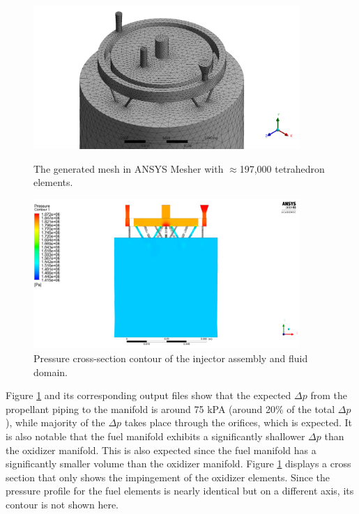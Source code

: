 \documentclass[9pt]{article} %
\numberwithin{equation}{section} %
\begin{document}
\begin{figure}
    \centering
    \begin{minipage}{0.49\textwidth}
        \centering
        \includegraphics[scale=0.5, width=0.9\textwidth]{sim_files/mesh_ss.png} %
        \caption{The generated mesh in ANSYS Mesher with $\approx$197,000 tetrahedron elements.}
        \label{fig:mesh}
    \end{minipage}\hfill
    \begin{minipage}{0.49\textwidth}
        \centering
        \includegraphics[scale=0.5, width=0.9\textwidth]{sim_files/pres_xsect1.png} %
        \caption{Pressure cross-section contour of the injector assembly and fluid domain.}
        \label{fig:pressure_contour}
    \end{minipage}
\end{figure}

Figure \ref{fig:pressure_contour} and its corresponding output files show that the expected $\Delta p$ from the propellant piping to the manifold is around 75 kPA (around 20\% of the total $\Delta p$), while majority of the $\Delta p$ takes place through the orifices, which is expected. It is also notable that the fuel manifold exhibits a significantly shallower $\Delta p$ than the oxidizer manifold. This is also expected since the fuel manifold has a significantly smaller volume than the oxidizer manifold. Figure \ref{fig:pressure_contour} displays a cross section that only shows the impingement of the oxidizer elements. Since the pressure profile for the fuel elements is nearly identical but on a different axis, its contour is not shown here.
\end{document}
